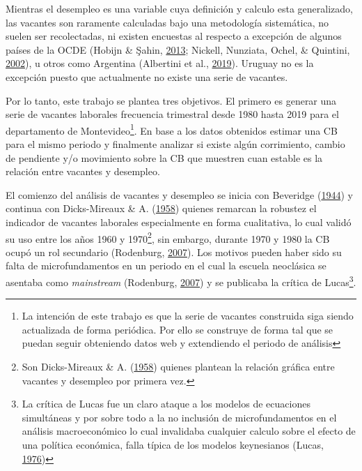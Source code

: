 \documentclass[12pt,oneside]{reedthesis}
\begin{document}
Mientras el desempleo es una variable cuya definición y calculo esta generalizado, las vacantes son raramente calculadas bajo una metodología sistemática, no suelen ser recolectadas, ni existen encuestas al respecto a excepción de algunos países de la OCDE (Hobijn \& Şahin, \protect\hyperlink{ref-Hobijn2013}{2013}; Nickell, Nunziata, Ochel, \& Quintini, \protect\hyperlink{ref-Nickell2002}{2002}), u otros como Argentina (Albertini et al., \protect\hyperlink{ref-ArgentinaBC2019}{2019}). Uruguay no es la excepción puesto que actualmente no existe una serie de vacantes.

Por lo tanto, este trabajo se plantea tres objetivos. El primero es generar una serie de vacantes laborales frecuencia trimestral desde 1980 hasta 2019 para el departamento de Montevideo\footnote{La intención de este trabajo es que la serie de vacantes construida siga siendo actualizada de forma periódica. Por ello se construye de forma tal que se puedan seguir obteniendo datos web y extendiendo el periodo de análisis}. En base a los datos obtenidos estimar una CB para el mismo periodo y finalmente analizar si existe algún corrimiento, cambio de pendiente y/o movimiento sobre la CB que muestren cuan estable es la relación entre vacantes y desempleo.

El comienzo del análisis de vacantes y desempleo se inicia con Beveridge (\protect\hyperlink{ref-Beveridge}{1944}) y continua con Dicks-Mireaux \& A. (\protect\hyperlink{ref-Dicks-Mireaux1958}{1958}) quienes remarcan la robustez el indicador de vacantes laborales especialmente en forma cualitativa, lo cual validó su uso entre los años 1960 y 1970\footnote{Son Dicks-Mireaux \& A. (\protect\hyperlink{ref-Dicks-Mireaux1958}{1958}) quienes plantean la relación gráfica entre vacantes y desempleo por primera vez.}, sin embargo, durante 1970 y 1980 la CB ocupó un rol secundario (Rodenburg, \protect\hyperlink{ref-Rodenburg2007}{2007}). Los motivos pueden haber sido su falta de microfundamentos en un periodo en el cual la escuela neoclásica se asentaba como \emph{mainstream} (Rodenburg, \protect\hyperlink{ref-Rodenburg2007}{2007}) y se publicaba la crítica de Lucas\footnote{La crítica de Lucas fue un claro ataque a los modelos de ecuaciones simultáneas y por sobre todo a la no inclusión de microfundamentos en el análisis macroeconómico lo cual invalidaba cualquier calculo sobre el efecto de una política económica, falla típica de los modelos keynesianos (Lucas, \protect\hyperlink{ref-Lucas1976}{1976})}.
\end{document}
